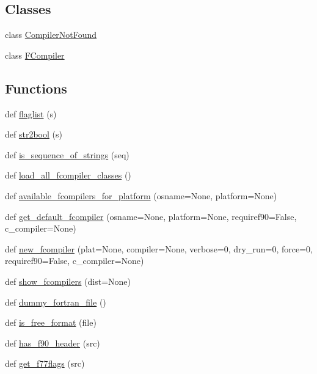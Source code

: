 \subsection*{Classes}
\begin{DoxyCompactItemize}
\item 
class \hyperlink{classnumpy_1_1distutils_1_1fcompiler_1_1CompilerNotFound}{Compiler\+Not\+Found}
\item 
class \hyperlink{classnumpy_1_1distutils_1_1fcompiler_1_1FCompiler}{F\+Compiler}
\end{DoxyCompactItemize}
\subsection*{Functions}
\begin{DoxyCompactItemize}
\item 
def \hyperlink{namespacenumpy_1_1distutils_1_1fcompiler_a86a775a3bb693cefb74038c84560a958}{flaglist} (s)
\item 
def \hyperlink{namespacenumpy_1_1distutils_1_1fcompiler_a181ca53e6e1b8a0b6daa0f2ed12eaca2}{str2bool} (s)
\item 
def \hyperlink{namespacenumpy_1_1distutils_1_1fcompiler_afb88b2a981e280b01d9a48f5950c1952}{is\+\_\+sequence\+\_\+of\+\_\+strings} (seq)
\item 
def \hyperlink{namespacenumpy_1_1distutils_1_1fcompiler_aa27381238f64e75e39e7bea89394161e}{load\+\_\+all\+\_\+fcompiler\+\_\+classes} ()
\item 
def \hyperlink{namespacenumpy_1_1distutils_1_1fcompiler_a5d010bfdc18ef8a8715c389b3e5ac94c}{available\+\_\+fcompilers\+\_\+for\+\_\+platform} (osname=None, platform=None)
\item 
def \hyperlink{namespacenumpy_1_1distutils_1_1fcompiler_a39ce48aec442d55137a840da6d41c1d9}{get\+\_\+default\+\_\+fcompiler} (osname=None, platform=None, requiref90=False, c\+\_\+compiler=None)
\item 
def \hyperlink{namespacenumpy_1_1distutils_1_1fcompiler_acb202e9bb6aa4e32fdadae297a70dea7}{new\+\_\+fcompiler} (plat=None, compiler=None, verbose=0, dry\+\_\+run=0, force=0, requiref90=False, c\+\_\+compiler=None)
\item 
def \hyperlink{namespacenumpy_1_1distutils_1_1fcompiler_af5d3c4731ff534c3474a2b9b5ebd9847}{show\+\_\+fcompilers} (dist=None)
\item 
def \hyperlink{namespacenumpy_1_1distutils_1_1fcompiler_ac54179f557a1d50edbcadd4ad6f463c0}{dummy\+\_\+fortran\+\_\+file} ()
\item 
def \hyperlink{namespacenumpy_1_1distutils_1_1fcompiler_ae533d78390900140c28f30b64dcb53ef}{is\+\_\+free\+\_\+format} (file)
\item 
def \hyperlink{namespacenumpy_1_1distutils_1_1fcompiler_a957a24c960c8b0f6bb2c69332f1c2e8b}{has\+\_\+f90\+\_\+header} (src)
\item 
def \hyperlink{namespacenumpy_1_1distutils_1_1fcompiler_a740db028b25a106e9171a210213e6558}{get\+\_\+f77flags} (src)
\end{DoxyCompactItemize}
